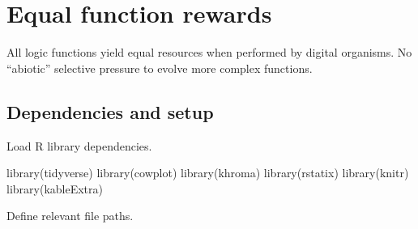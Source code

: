 \documentclass[
]{book}
\newenvironment{Shaded}{\begin{snugshade}}{\end{snugshade}}
\newcommand{\FunctionTok}[1]{\textcolor[rgb]{0.00,0.00,0.00}{#1}}
\newcommand{\NormalTok}[1]{#1}
\begin{document}
\hypertarget{equal-function-rewards}{%
\chapter{Equal function rewards}\label{equal-function-rewards}}

All logic functions yield equal resources when performed by digital organisms.
No ``abiotic'' selective pressure to evolve more complex functions.

\hypertarget{dependencies-and-setup}{%
\section{Dependencies and setup}\label{dependencies-and-setup}}

Load R library dependencies.

\begin{Shaded}
\begin{Highlighting}[]
\FunctionTok{library}\NormalTok{(tidyverse)}
\FunctionTok{library}\NormalTok{(cowplot)}
\FunctionTok{library}\NormalTok{(khroma)}
\FunctionTok{library}\NormalTok{(rstatix)}
\FunctionTok{library}\NormalTok{(knitr)}
\FunctionTok{library}\NormalTok{(kableExtra)}
\end{Highlighting}
\end{Shaded}

Define relevant file paths.
\end{document}
